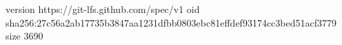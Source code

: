 version https://git-lfs.github.com/spec/v1
oid sha256:27c56a2ab17735b3847aa1231dfbb0803ebc81effdef93174cc3bed51acf3779
size 3690
